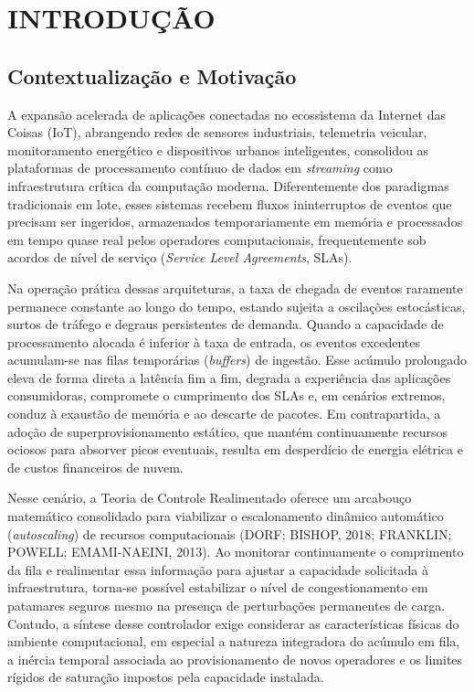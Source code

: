 \section{INTRODUÇÃO}\label{sec:intro}

\subsection{Contextualização e Motivação}\label{sec:intro_contexto}
A expansão acelerada de aplicações conectadas no ecossistema da Internet das Coisas (IoT), abrangendo redes de sensores industriais, telemetria veicular, monitoramento energético e dispositivos urbanos inteligentes, consolidou as plataformas de processamento contínuo de dados em \textit{streaming} como infraestrutura crítica da computação moderna. Diferentemente dos paradigmas tradicionais em lote, esses sistemas recebem fluxos ininterruptos de eventos que precisam ser ingeridos, armazenados temporariamente em memória e processados em tempo quase real pelos operadores computacionais, frequentemente sob acordos de nível de serviço (\textit{Service Level Agreements}, SLAs).

Na operação prática dessas arquiteturas, a taxa de chegada de eventos raramente permanece constante ao longo do tempo, estando sujeita a oscilações estocásticas, surtos de tráfego e degraus persistentes de demanda. Quando a capacidade de processamento alocada é inferior à taxa de entrada, os eventos excedentes acumulam-se nas filas temporárias (\textit{buffers}) de ingestão. Esse acúmulo prolongado eleva de forma direta a latência fim a fim, degrada a experiência das aplicações consumidoras, compromete o cumprimento dos SLAs e, em cenários extremos, conduz à exaustão de memória e ao descarte de pacotes. Em contrapartida, a adoção de superprovisionamento estático, que mantém continuamente recursos ociosos para absorver picos eventuais, resulta em desperdício de energia elétrica e de custos financeiros de nuvem.

Nesse cenário, a Teoria de Controle Realimentado oferece um arcabouço matemático consolidado para viabilizar o escalonamento dinâmico automático (\textit{autoscaling}) de recursos computacionais (DORF; BISHOP, 2018; FRANKLIN; POWELL; EMAMI-NAEINI, 2013). Ao monitorar continuamente o comprimento da fila e realimentar essa informação para ajustar a capacidade solicitada à infraestrutura, torna-se possível estabilizar o nível de congestionamento em patamares seguros mesmo na presença de perturbações permanentes de carga. Contudo, a síntese desse controlador exige considerar as características físicas do ambiente computacional, em especial a natureza integradora do acúmulo em fila, a inércia temporal associada ao provisionamento de novos operadores e os limites rígidos de saturação impostos pela capacidade instalada.

